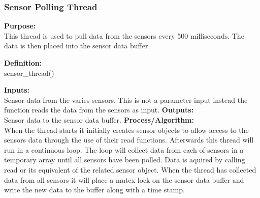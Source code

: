 \documentclass[10pt,draftclsnofoot,onecolumn,retainorgcmds]{IEEEtran}
\begin{document}
\subsubsection{Sensor Polling Thread}
{\bf Purpose:} \\
This thread is used to pull data from the sensors every 500 milliseconds. The data is then placed into the sensor data buffer. \par
{\bf Definition:} \\ 
sensor\_thread() \par
{\bf Inputs:} \\  Sensor data from the varies sensors. This is not a parameter input instead the function reads the data from the sensors as input.
{\bf Outputs:} \\ Sensor data to the sensor data buffer.
{\bf Process/Algorithm:} \\
When the thread starts it initially creates sensor objects to allow access to the sensors data through the use of their read functions. Afterwards this thread will run in a continuous loop. The loop will collect data from each of sensors in a temporary array until all sensors have been polled. Data is aquired by calling read or its equivalent of the related sensor object. When the thread has collected data from all sensors it will place a mutex lock on the sensor data buffer and write the new data to the buffer along with a time stamp. \par
\end{document}
